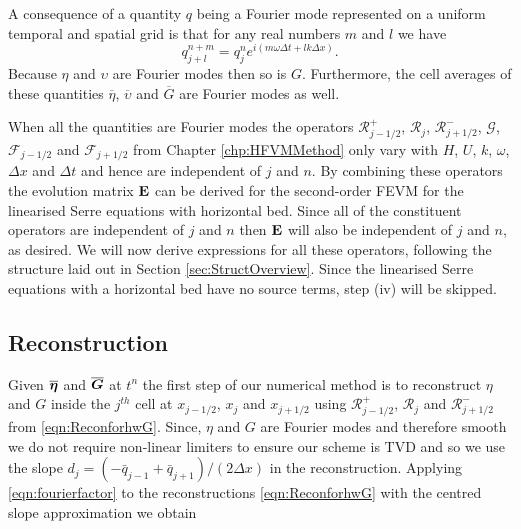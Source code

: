 A consequence of a quantity $q$ being a Fourier mode represented on a uniform temporal and spatial grid is that for any real numbers $m$ and $l$ we have
\begin{equation}
q^{n + m}_{j + l} = q^n_j e^{ i \left(m \omega \Delta t + l k \Delta x\right)}.
\label{eqn:fourierfactor}
\end{equation}
Because $\eta$ and $\upsilon$ are Fourier modes then so is $G$. Furthermore, the cell averages of these quantities $\overline{\eta}$, $\overline{\upsilon}$ and $\overline{G}$ are Fourier modes as well.

When all the quantities are Fourier modes the operators $\mathcal{R}^+_{j-1/2}$, $\mathcal{R}_{j}$, $\mathcal{R}^-_{j+1/2}$, $\mathcal{G}$, $\mathcal{F}_{j-1/2}$ and $\mathcal{F}_{j+1/2}$ from Chapter \ref{chp:HFVMMethod} only vary with $H$, $U$, $k$, $\omega$, $\Delta x$ and $\Delta t$ and hence are independent of $j$ and $n$. By combining these operators the evolution matrix $\mathbf{E}$ can be derived for the second-order FEVM for the linearised Serre equations with horizontal bed. Since all of the constituent operators are independent of $j$ and $n$ then $\mathbf{E}$ will also be independent of $j$ and $n$, as desired. We will now derive expressions for all these operators, following the structure laid out in Section \ref{sec:StructOverview}. Since the linearised Serre equations with a horizontal bed have no source terms, step (iv) will be skipped.   

\setcounter{subsection}{0}
\renewcommand{\thesubsection}{(\roman{subsection})} 
\subsection{Reconstruction}
Given $\overline{\boldsymbol{\eta}}$ and $\overline{\boldsymbol{G}}$ at $t^n$ the first step of our numerical method is to reconstruct $\eta$ and $G$ inside the $j^{th}$ cell at $x_{j-1/2}$, $x_j$ and $x_{j+1/2}$ using $\mathcal{R}^+_{j-1/2}$, $\mathcal{R}_{j}$ and $\mathcal{R}^-_{j+1/2}$ from \eqref{eqn:ReconforhwG}. Since, $\eta$ and $G$ are Fourier modes and therefore smooth we do not require non-linear limiters to ensure our scheme is TVD and so we use the slope $d_j = \left({-\bar{q}_{j-1} +\bar{q}_{j+1}}\right)/ \left({2\Delta x} \right)$ in the reconstruction. Applying \eqref{eqn:fourierfactor} to the reconstructions \eqref{eqn:ReconforhwG} with the centred slope approximation we obtain 

